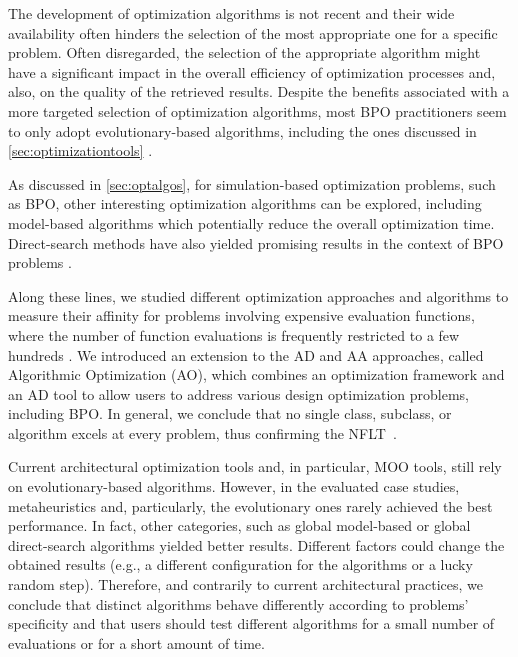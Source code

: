 The development of optimization algorithms is not recent and their wide availability often hinders the selection of the most appropriate one for a specific problem. Often disregarded, the selection of the appropriate algorithm might have a significant impact in the overall efficiency of optimization processes and, also, on the quality of the retrieved results\cite{Wolpert1997NFLT}. Despite the benefits associated with a more targeted selection of optimization algorithms, most \ac{BPO} practitioners seem to only adopt evolutionary-based algorithms, including the ones discussed in \cref{sec:optimizationtools} \cite{Evins2013,Nguyen2014}. 

As discussed in \cref{sec:optalgos}, for simulation-based optimization problems, such as \ac{BPO}, other interesting optimization algorithms can be explored, including model-based algorithms which potentially reduce the overall optimization time\cite{Wortmann2017GABESTCHOICE}. Direct-search methods have also yielded promising results in the context of \ac{BPO} problems \cite{Waibel2018}. 

Along these lines, we studied different optimization approaches and algorithms to measure their affinity for problems involving expensive evaluation functions, where the number of function evaluations is frequently restricted to a few hundreds \cite{Caetano2018,Belem2018optimizeddesign,Belem2019MOO}. We introduced an extension to the \ac{AD} and \ac{AA} approaches, called Algorithmic Optimization (\ac{AO}), which combines an optimization framework and an \ac{AD} tool to allow users to address various design optimization problems, including \ac{BPO}. In general, we conclude that no single class, subclass, or algorithm excels at every problem, thus confirming the \ac{NFLT}~\cite{Wolpert1997NFLT}.  

Current architectural optimization tools and, in particular, \ac{MOO} tools, still rely on evolutionary-based algorithms. However, in the evaluated case studies, metaheuristics and, particularly, the evolutionary ones rarely achieved the best performance. In fact, other categories, such as global model-based or global direct-search algorithms yielded better results. Different factors could change the obtained results (e.g., a different configuration for the algorithms or a lucky random step). Therefore, and contrarily to current architectural practices, we conclude that distinct algorithms behave differently according to  problems' specificity and that users should test different algorithms for a small number of evaluations or for a short amount of time. 

